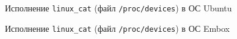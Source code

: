 \begin{figure}[H]
\caption{Исполнение \texttt{linux\_cat} (файл \texttt{/proc/devices}) в ОС Ubuntu}
\label{fig:linux_cat}
\end{figure}

\begin{figure}[H]
\caption{Исполнение \texttt{linux\_cat} (файл \texttt{/proc/devices}) в ОС Embox}
\label{fig:embox_cat_devices}
\end{figure}

